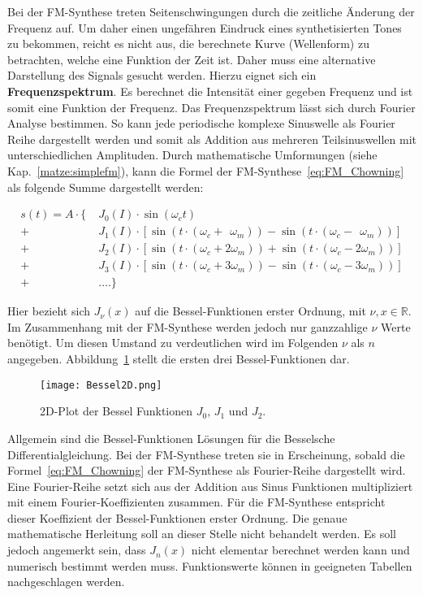 Bei der FM-Synthese treten Seitenschwingungen durch die zeitliche Änderung der Frequenz auf. Um daher einen ungefähren Eindruck eines synthetisierten Tones zu bekommen, reicht es nicht aus, die berechnete Kurve (Wellenform) zu betrachten, welche eine Funktion der Zeit ist. Daher muss eine alternative Darstellung des Signals gesucht werden. 
Hierzu eignet sich ein \textbf{Frequenzspektrum}. Es berechnet die Intensität einer gegeben Frequenz und ist somit eine Funktion der Frequenz. Das Frequenzspektrum lässt sich durch Fourier Analyse bestimmen. So kann jede periodische komplexe Sinuswelle als Fourier Reihe dargestellt werden und somit als Addition aus mehreren Teilsinuswellen mit unterschiedlichen Amplituden. \cite[S. 33]{raichel} Durch mathematische Umformungen (siehe Kap.~\ref{matze:simplefm}), kann die Formel der FM-Synthese~\ref{eq:FM_Chowning} als folgende Summe dargestellt werden: \cite{chowningPaper}

\begin{equation}
\begin{split}
s(t)=A\cdot \{\; & J_0(I)\cdot\sin(\omega_c t)  \\
         +&J_1(I)\cdot [\sin(t\cdot (\omega_c + \;\,\omega_m))-\sin(t\cdot (\omega_c-\;\,\omega_m))] \\
         +&J_2(I)\cdot [\sin(t\cdot (\omega_c + 2\omega_m))+\sin(t\cdot (\omega_c-2\omega_m))] \\
         +&J_3(I)\cdot [\sin(t\cdot (\omega_c + 3\omega_m))-\sin(t\cdot (\omega_c-3\omega_m))] \\
         +&....\}
\end{split}
\label{eq:chowningAddition}
\end{equation}

Hier bezieht sich $J_\nu(x)$ auf die Bessel-Funktionen erster Ordnung, mit $\nu,x \in \mathbb{R}$. \cite[S. 223]{temme} Im Zusammenhang mit der FM-Synthese werden jedoch nur ganzzahlige $\nu$ Werte benötigt. Um diesen Umstand zu verdeutlichen wird im Folgenden $\nu$ als $n$ angegeben. Abbildung~\ref{fig:bessel2D} stellt die ersten drei Bessel-Funktionen dar.

\begin{figure} [ht]
\centering
  \texttt{[image: Bessel2D.png]}
\caption{2D-Plot der Bessel Funktionen $J_0$, $J_1$ und $J_2$.}
\label{fig:bessel2D}
\end{figure}

\FloatBarrier


Allgemein sind die Bessel-Funktionen Lösungen für die Besselsche Differentialgleichung.\cite[S. 220]{temme} Bei der FM-Synthese treten sie in Erscheinung, sobald die Formel~\ref{eq:FM_Chowning} der FM-Synthese als Fourier-Reihe dargestellt wird. Eine Fourier-Reihe setzt sich aus der Addition aus Sinus Funktionen multipliziert mit einem Fourier-Koeffizienten zusammen. Für die FM-Synthese entspricht dieser Koeffizient der Bessel-Funktionen erster Ordnung. \cite[S. 221]{lathi} Die genaue mathematische Herleitung soll an dieser Stelle nicht behandelt werden. Es soll jedoch angemerkt sein, dass $J_n(x)$ nicht elementar berechnet werden kann und numerisch bestimmt werden muss.\cite[S. 385]{abramowitz} Funktionswerte können in geeigneten Tabellen nachgeschlagen werden. \cite{davis}

